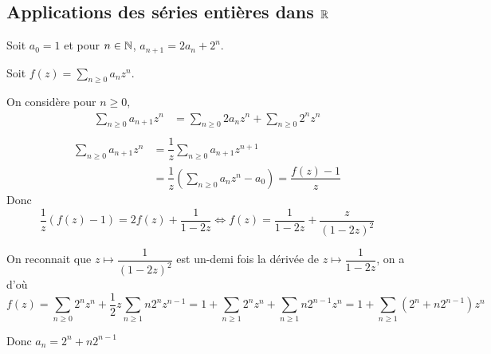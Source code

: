 \documentclass[a4paper, 12pt]{article}
\begin{document}
\subsection{Applications des séries entières dans $\mathbb{R}$}

\begin{exemple}
    Soit $a_0 = 1$ et pour $n \in \mathbb{N}$, $a_{n+1} = 2 a_n + 2^n$.

    Soit $f(z) = \sum_{n \geq 0} a_n z^n$.

    On considère pour $n \geq 0$,
    \begin{align*}
        \sum\limits_{n \geq 0} a_{n+1}z^n &= \sum\limits_{n \geq 0} 2 a_n z^n + \sum\limits_{n \geq 0} 2^n z^n \\
    \end{align*}
    \begin{align*}
        \sum\limits_{n \geq 0} a_{n+1}z^n &= \dfrac{1}{z} \sum\limits_{n \geq 0} a_{n + 1} z^{n + 1} \\
        &= \dfrac{1}{z} \left( \sum\limits_{n \geq 0} a_n z^n - a_0 \right) = \dfrac{f(z) - 1}{z}
    \end{align*}
    Donc
    $$
    \dfrac{1}{z} (f(z) - 1) = 2 f(z) + \dfrac{1}{1 - 2z} \iff f(z) = \dfrac{1}{1 - 2z} + \dfrac{z}{(1 - 2z)^2}
    $$

    On reconnait que $z \mapsto \dfrac{1}{(1 - 2z)^2}$ est un-demi fois la dérivée de $z \mapsto \dfrac{1}{1 - 2z}$, on a
    d'où
    $$
    f(z) = \sum_{n \geq 0} 2^n z^n + \dfrac{1}{2}z \sum_{n \geq 1} n2^n z^{n - 1} = 1 + \sum_{n \geq 1} 2^n z^n + \sum_{n \geq 1} n 2^{n - 1} z^n = 1 + \sum_{n \geq 1} (2^n + n 2^{n - 1}) z^n
    $$ 

    Donc $a_n = 2^n + n2^{n - 1}$
\end{exemple}
\end{document}
